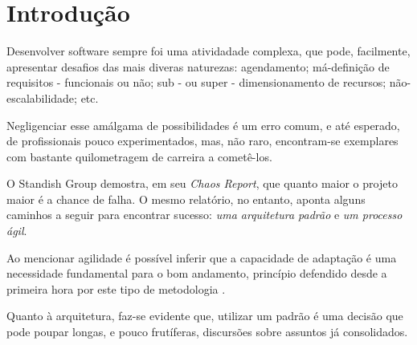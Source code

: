 \section{Introdução}

  Desenvolver software sempre foi uma atividadade complexa, que pode, facilmente,  apresentar desafios das mais diveras naturezas: agendamento; má-definição de  requisitos - funcionais ou não; sub - ou super - dimensionamento de recursos; não-escalabilidade; etc.

  Negligenciar esse amálgama de possibilidades é um erro comum, e até esperado, de profissionais pouco experimentados, mas, não raro, encontram-se exemplares com bastante quilometragem de carreira a cometê-los.

  O Standish Group demostra, em seu \emph{Chaos Report}\cite{ChaosReport2015}, que quanto maior o projeto maior é a chance de falha. O mesmo relatório, no entanto, aponta alguns caminhos a seguir para encontrar sucesso: \emph{uma arquitetura padrão} e \emph{um processo ágil}.

  Ao mencionar agilidade é possível inferir que a capacidade de adaptação é uma  necessidade fundamental para o bom andamento, princípio defendido desde a  primeira hora por este tipo de metodologia \cite{ManifestoAgil2001}.

  Quanto à  arquitetura, faz-se evidente que, utilizar um padrão é uma decisão que  pode poupar longas, e pouco frutíferas, discursões sobre assuntos já consolidados.
